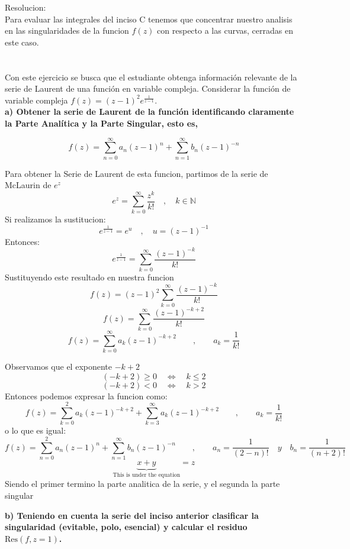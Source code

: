 \documentclass[12pt]{report}
\begin{document}
Resolucion:\\
Para evaluar las integrales del inciso C tenemos que concentrar nuestro analisis en las singularidades de la funcion $f(z)$ con respecto a las curvas, cerradas en este caso.\\

\chapter{}%

Con este ejercicio se busca que el estudiante obtenga información relevante de la serie de Laurent de una función en variable compleja.
Considerar la función de variable compleja $ f(z) = (z - 1)^2 e^\frac{1}{z - 1} $.\\[6pt]

\textbf{a)  Obtener la serie de Laurent de la función identificando claramente la Parte Analítica y la Parte Singular, esto es,}

$$ f(z) = \sum_{n=0}^{\infty} a_n(z - 1)^n + \sum_{n=1}^{\infty} b_n(z - 1)^{-n} $$

Para obtener la Serie de Laurent de esta funcion, partimos de la serie de McLaurin de $e^z$
$$e^z=\sum_{k=0}^{\infty}\frac{z^k}{k!}\quad,\quad k \in \mathbb{N}$$
Si realizamos la sustitucion:
$$e^\frac{1}{z - 1}=e^u \quad, \quad u=(z - 1)^{-1}$$
Entonces:
$$e^\frac{1}{z - 1}=\sum_{k=0}^{\infty}\frac{(z - 1)^{-k}}{k!}$$
Sustituyendo este resultado en nuestra funcion
$$f(z) = (z - 1)^2 \sum_{k=0}^{\infty}\frac{(z - 1)^{-k}}{k!}$$
$$f(z) = \sum_{k=0}^{\infty}\frac{(z - 1)^{-k+2}}{k!}$$
$$f(z) = \sum_{k=0}^{\infty}a_k(z - 1)^{-k+2}\qquad, \qquad a_k=\frac{1}{k!}$$

Observamos que el exponente $-k+2$
$$(-k+2) \geq 0 \quad \Leftrightarrow \quad k \leq 2$$
$$(-k+2) < 0 \quad \Leftrightarrow \quad k>2$$
Entonces podemos expresar la funcion como:
$$f(z) = \sum_{k=0}^{2}a_k(z - 1)^{-k+2} + \sum_{k=3}^{\infty}a_k(z - 1)^{-k+2}\qquad, \qquad a_k=\frac{1}{k!}$$
o lo que es igual:
$$f(z) = \sum_{n=0}^{2}a_n(z - 1)^{n} + \sum_{n=1}^{\infty}b_n(z - 1)^{-n}\qquad, \qquad a_n=\frac{1}{(2-n)!}\quad y \quad b_n=\frac{1}{(n+2)!}$$
$$\underbrace{x + y}_{\text{This is under the equation}} = z$$
Siendo el primer termino la parte analitica de la serie, y el segunda la parte singular

\textbf{b)  Teniendo en cuenta la serie del inciso anterior clasificar la singularidad (evitable, polo, esencial) y calcular el residuo \( \text{Res}(f, z = 1) \).}\\[6pt]
\end{document}
